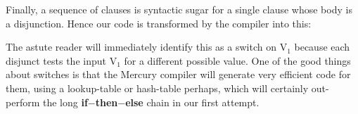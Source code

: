 \documentclass[a4paper,11pt,notitlepage,onecolumn]{book}
\begin{document}
Finally, a sequence of clauses is syntactic sugar for a single clause whose
body is a disjunction.  Hence our code is transformed by the compiler
into this:
\begin{small}

\begin{ptabular}
\nextline
{}
\nextline
{}
\nextline
{}
\nextline
{}
\nextline
{}
\nextline
{}
\nextline
{}
\nextline
\end{ptabular}

\end{small}
The astute reader will immediately identify this as a switch on \textsf{V$_{1}$} because
each disjunct tests the input \textsf{V$_{1}$} for a different possible value.  One of
the good things about switches is that the Mercury compiler will generate
very efficient code for them, using a lookup-table or hash-table perhaps,
which will certainly out-perform the long \textsf{\textbf{if}{\ensuremath{-}}\textbf{then}{\ensuremath{-}}\textbf{else}} chain in our
first attempt.
\end{document}
